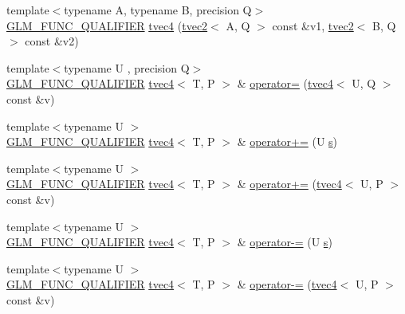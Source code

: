 \begin{DoxyCompactItemize}
\item 
{\footnotesize template$<$typename A, typename B, precision Q$>$ }\\\hyperlink{setup_8hpp_a33fdea6f91c5f834105f7415e2a64407}{G\+L\+M\+\_\+\+F\+U\+N\+C\+\_\+\+Q\+U\+A\+L\+I\+F\+I\+ER} \hyperlink{structglm_1_1detail_1_1tvec4_a5ae1182faaf5b3409da227032738f74a}{tvec4} (\hyperlink{structglm_1_1detail_1_1tvec2}{tvec2}$<$ A, Q $>$ const \&v1, \hyperlink{structglm_1_1detail_1_1tvec2}{tvec2}$<$ B, Q $>$ const \&v2)
\item 
{\footnotesize template$<$typename U , precision Q$>$ }\\\hyperlink{setup_8hpp_a33fdea6f91c5f834105f7415e2a64407}{G\+L\+M\+\_\+\+F\+U\+N\+C\+\_\+\+Q\+U\+A\+L\+I\+F\+I\+ER} \hyperlink{structglm_1_1detail_1_1tvec4}{tvec4}$<$ T, P $>$ \& \hyperlink{structglm_1_1detail_1_1tvec4_ab4a4d05d0c40397a25fdb2c2a5c4cd3f}{operator=} (\hyperlink{structglm_1_1detail_1_1tvec4}{tvec4}$<$ U, Q $>$ const \&v)
\item 
{\footnotesize template$<$typename U $>$ }\\\hyperlink{setup_8hpp_a33fdea6f91c5f834105f7415e2a64407}{G\+L\+M\+\_\+\+F\+U\+N\+C\+\_\+\+Q\+U\+A\+L\+I\+F\+I\+ER} \hyperlink{structglm_1_1detail_1_1tvec4}{tvec4}$<$ T, P $>$ \& \hyperlink{structglm_1_1detail_1_1tvec4_a6dcf29c92985638ec2b9b126efbe6f34}{operator+=} (U \hyperlink{structglm_1_1detail_1_1tvec4_a82cbced4cbd070056c5acbc1d4d4906f}{s})
\item 
{\footnotesize template$<$typename U $>$ }\\\hyperlink{setup_8hpp_a33fdea6f91c5f834105f7415e2a64407}{G\+L\+M\+\_\+\+F\+U\+N\+C\+\_\+\+Q\+U\+A\+L\+I\+F\+I\+ER} \hyperlink{structglm_1_1detail_1_1tvec4}{tvec4}$<$ T, P $>$ \& \hyperlink{structglm_1_1detail_1_1tvec4_a90b24c30c735740c53e5549eb7c698b1}{operator+=} (\hyperlink{structglm_1_1detail_1_1tvec4}{tvec4}$<$ U, P $>$ const \&v)
\item 
{\footnotesize template$<$typename U $>$ }\\\hyperlink{setup_8hpp_a33fdea6f91c5f834105f7415e2a64407}{G\+L\+M\+\_\+\+F\+U\+N\+C\+\_\+\+Q\+U\+A\+L\+I\+F\+I\+ER} \hyperlink{structglm_1_1detail_1_1tvec4}{tvec4}$<$ T, P $>$ \& \hyperlink{structglm_1_1detail_1_1tvec4_a9f142d5c9e7da212eb8cad6fbd77e5d3}{operator-\/=} (U \hyperlink{structglm_1_1detail_1_1tvec4_a82cbced4cbd070056c5acbc1d4d4906f}{s})
\item 
{\footnotesize template$<$typename U $>$ }\\\hyperlink{setup_8hpp_a33fdea6f91c5f834105f7415e2a64407}{G\+L\+M\+\_\+\+F\+U\+N\+C\+\_\+\+Q\+U\+A\+L\+I\+F\+I\+ER} \hyperlink{structglm_1_1detail_1_1tvec4}{tvec4}$<$ T, P $>$ \& \hyperlink{structglm_1_1detail_1_1tvec4_a73b420ad2330e7ea2cd2e9b4d1df7ba9}{operator-\/=} (\hyperlink{structglm_1_1detail_1_1tvec4}{tvec4}$<$ U, P $>$ const \&v)

\end{DoxyCompactItemize}
